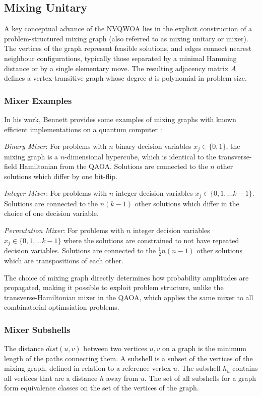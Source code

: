 \subsection{Mixing Unitary}
A key conceptual advance of the NVQWOA lies in the explicit construction of a problem-structured mixing graph (also referred to as mixing unitary or mixer). The vertices of the graph represent feasible solutions, and edges connect nearest neighbour configurations, typically those separated by a minimal Hamming distance or by a single elementary move. The resulting adjacency matrix $A$ defines a vertex-transitive graph whose degree $d$ is polynomial in problem size.

\subsubsection{Mixer Examples}

In his work, Bennett provides some examples of mixing graphs with known efficient implementations on a quantum computer \cite{bennett2024nonvariational,bennett2024analysisnonvariationalquantumwalkbased}:

\textit{Binary Mixer}: For problems with $n$ binary decision variables $x_j\in\{0,1\}$, the mixing graph is a $n$-dimensional hypercube, which is identical to the transverse-field Hamiltonian from the QAOA. Solutions are connected to the $n$ other solutions which differ by one bit-flip.

\textit{Integer Mixer}: For problems with $n$ integer decision variables $x_j\in\{0,1,...k-1\}$. Solutions are connected to the $n(k-1)$ other solutions which differ in the choice of one decision variable.

\textit{Permutation Mixer}: For problems with $n$ integer decision variables $x_j\in\{0,1,...k-1\}$ where the solutions are constrained to not have repeated decision variables. Solutions are connected to the $\frac{1}{2}n(n-1)$ other solutions which are transpositions of each other.

The choice of mixing graph directly determines how probability amplitudes are propagated, making it possible to exploit problem structure, unlike the transverse-Hamiltonian mixer in the QAOA, which applies the same mixer to all combinatorial optimsiation problems\cite{QAOA}.

\subsubsection{Mixer Subshells}\label{sec:subshell}
The distance $dist(u,v)$ between two vertices $u,v$ on a graph is the minimum length of the paths connecting them. A subshell is a subset of the vertices of the mixing graph, defined in relation to a reference vertex $u$. The subshell $h_u$ contains all vertices that are a distance $h$ away from $u$. The set of all subshells for a graph form equivalence classes on the set of the vertices of the graph.

